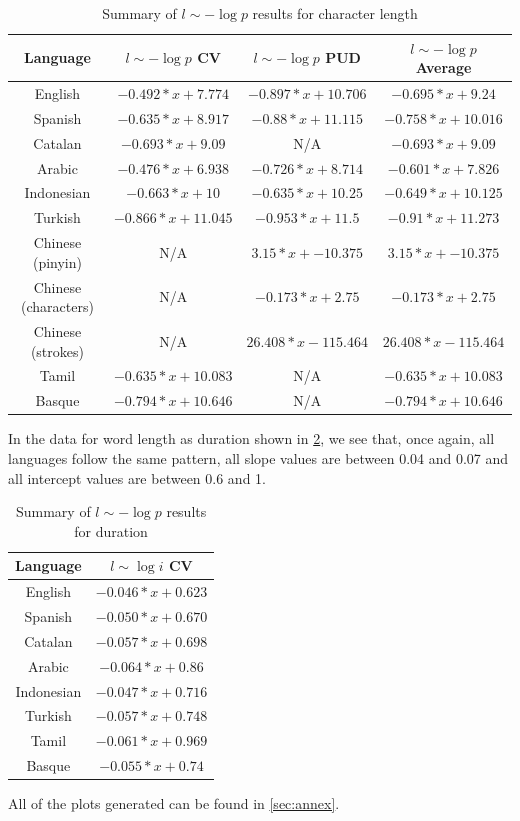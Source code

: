 \begin{table}[H]
    \centering
    \begin{tabular}{c|c|c|c}
        Language & $l \sim -\log p$ CV & $l \sim -\log p$ PUD & $l \sim -\log p$ Average \\ \hline
        English & $-0.492*x + 7.774$ & $-0.897*x + 10.706$ & $-0.695*x + 9.24$ \\
        Spanish & $-0.635*x + 8.917$ & $-0.88*x + 11.115$ & $-0.758*x + 10.016$ \\
        Catalan & $-0.693*x + 9.09$ & N/A & $-0.693*x + 9.09$ \\
        Arabic & $-0.476*x + 6.938$ & $-0.726*x + 8.714$ & $-0.601*x + 7.826$ \\
        Indonesian & $-0.663*x + 10$ & $-0.635*x + 10.25$ & $-0.649*x + 10.125$ \\
        Turkish & $-0.866*x + 11.045$ & $-0.953*x + 11.5$ & $-0.91*x + 11.273$ \\
        Chinese (pinyin) & N/A & $3.15*x + -10.375$ & $3.15*x + -10.375$ \\
        Chinese (characters) & N/A & $-0.173*x + 2.75$ & $-0.173*x + 2.75$ \\
        Chinese (strokes) & N/A & $26.408*x - 115.464$ & $26.408*x - 115.464$ \\
        Tamil & $-0.635*x + 10.083$ & N/A & $-0.635*x + 10.083$ \\
        Basque & $-0.794*x + 10.646$ & N/A & $-0.794*x + 10.646$ \\
    \end{tabular}
    \caption{Summary of $l \sim -\log p$ results for character length}
    \label{tab:logp_cl}
\end{table}

In the data for word length as duration shown in \cref{tab:logp_d}, we see that, once again, all languages follow the same pattern, all slope values are between 0.04 and 0.07 and all intercept values are between 0.6 and 1.

\begin{table}[H]
    \centering
    \begin{tabular}{c|c}
        Language & $l \sim \log i$ CV \\ \hline
        English & $-0.046*x + 0.623$ \\
        Spanish & $-0.050*x + 0.670$ \\
        Catalan & $-0.057*x + 0.698$ \\
        Arabic & $-0.064*x + 0.86$ \\
        Indonesian & $-0.047*x + 0.716$ \\
        Turkish & $-0.057*x + 0.748$ \\
        Tamil & $-0.061*x + 0.969$ \\
        Basque & $-0.055*x + 0.74$ \\
    \end{tabular}
    \caption{Summary of $l \sim -\log p$ results for duration}
    \label{tab:logp_d}
\end{table}

All of the plots generated can be found in \cref{sec:annex}.